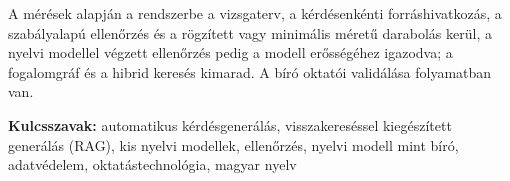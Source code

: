 A mérések alapján a rendszerbe a vizsgaterv, a kérdésenkénti forráshivatkozás, a szabályalapú ellenőrzés és a
rögzített vagy minimális méretű darabolás kerül, a nyelvi modellel végzett ellenőrzés pedig a modell erősségéhez
igazodva; a fogalomgráf és a hibrid keresés kimarad. A bíró oktatói validálása folyamatban van.

\medskip
\noindent\textbf{Kulcsszavak:} automatikus kérdésgenerálás, visszakereséssel kiegészített generálás (RAG),
kis nyelvi modellek, ellenőrzés, nyelvi modell mint bíró, adatvédelem, oktatástechnológia, magyar nyelv
